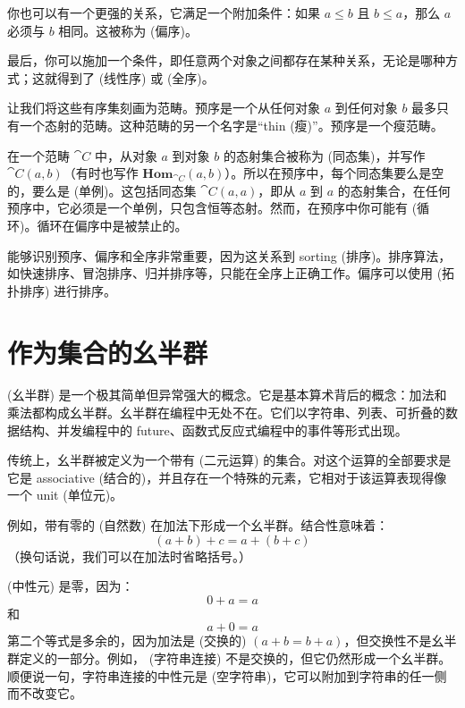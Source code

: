你也可以有一个更强的关系，它满足一个附加条件：如果 $a \leqslant b$ 且 $b \leqslant a$，那么 $a$ 必须与 $b$ 相同。这被称为  (偏序)。

最后，你可以施加一个条件，即任意两个对象之间都存在某种关系，无论是哪种方式；这就得到了  (线性序) 或  (全序)。

让我们将这些有序集刻画为范畴。预序是一个从任何对象 $a$ 到任何对象 $b$ 最多只有一个态射的范畴。这种范畴的另一个名字是“thin (瘦)”。预序是一个瘦范畴。

在一个范畴 $\cat{C}$ 中，从对象 $a$ 到对象 $b$ 的态射集合被称为  (同态集)，并写作 $\cat{C}(a, b)$（有时也写作 $\mathbf{Hom}_{\cat{C}}(a, b)$）。所以在预序中，每个同态集要么是空的，要么是  (单例)。这包括同态集 $\cat{C}(a, a)$，即从 $a$ 到 $a$ 的态射集合，在任何预序中，它必须是一个单例，只包含恒等态射。然而，在预序中你可能有  (循环)。循环在偏序中是被禁止的。

能够识别预序、偏序和全序非常重要，因为这关系到 sorting (排序)。排序算法，如快速排序、冒泡排序、归并排序等，只能在全序上正确工作。偏序可以使用  (拓扑排序) 进行排序。

\section{作为集合的幺半群}

 (幺半群) 是一个极其简单但异常强大的概念。它是基本算术背后的概念：加法和乘法都构成幺半群。幺半群在编程中无处不在。它们以字符串、列表、可折叠的数据结构、并发编程中的 future、函数式反应式编程中的事件等形式出现。

传统上，幺半群被定义为一个带有  (二元运算) 的集合。对这个运算的全部要求是它是 associative (结合的)，并且存在一个特殊的元素，它相对于该运算表现得像一个 unit (单位元)。

例如，带有零的  (自然数) 在加法下形成一个幺半群。结合性意味着：
\[(a + b) + c = a + (b + c)\]
（换句话说，我们可以在加法时省略括号。）

 (中性元) 是零，因为：
\[0 + a = a\]
和
\[a + 0 = a\]
第二个等式是多余的，因为加法是  (交换的) $(a + b = b + a)$，但交换性不是幺半群定义的一部分。例如， (字符串连接) 不是交换的，但它仍然形成一个幺半群。顺便说一句，字符串连接的中性元是  (空字符串)，它可以附加到字符串的任一侧而不改变它。

